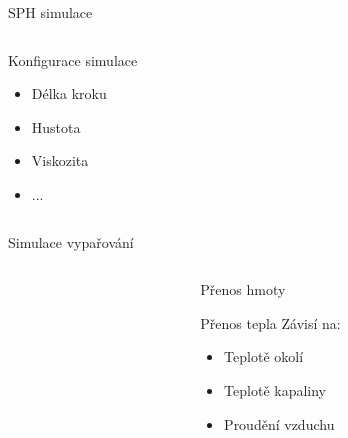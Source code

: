 \documentclass[10pt,xcolor=pdflatex,hyperref={unicode},aspectratio=169]{beamer}
\begin{document}

\begin{frame}{SPH simulace}
        \begin{columns}
            \begin{column}{0.5\textwidth}
            Konfigurace simulace
            \begin{itemize}
                \item Délka kroku
                \item Hustota
                \item Viskozita
                \item ...
            \end{itemize}
        \end{column}
            \begin{column}{0.5\textwidth}
            \begin{center}
            \end{center}
        \end{column}
    \end{columns}

    
\end{frame}

\begin{frame}{Simulace vypařování}
        \begin{columns}
            \hspace{.4cm}
            \begin{column}{0.5\textwidth}
            \begin{center}
            \end{center}
        \end{column}
        \begin{column}{0.5\textwidth}
            Přenos hmoty
            
            Přenos tepla
            \bigbreak
            Závisí na:
            \begin{itemize}
                \item Teplotě okolí
                \item Teplotě kapaliny
                \item Proudění vzduchu
            \end{itemize}
        \end{column}
    \end{columns}
    
\end{frame}
\end{document}
